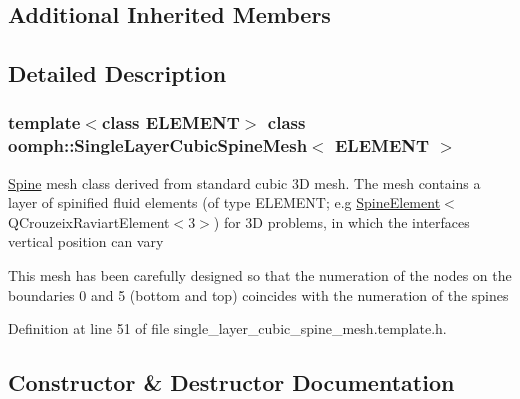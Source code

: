 \subsection*{Additional Inherited Members}


\subsection{Detailed Description}
\subsubsection*{template$<$class E\+L\+E\+M\+E\+NT$>$\newline
class oomph\+::\+Single\+Layer\+Cubic\+Spine\+Mesh$<$ E\+L\+E\+M\+E\+N\+T $>$}

\hyperlink{classoomph_1_1Spine}{Spine} mesh class derived from standard cubic 3D mesh. The mesh contains a layer of spinified fluid elements (of type E\+L\+E\+M\+E\+NT; e.\+g \hyperlink{classoomph_1_1SpineElement}{Spine\+Element}$<$Q\+Crouzeix\+Raviart\+Element$<$3$>$) for 3D problems, in which the interface\textquotesingle{}s vertical position can vary

This mesh has been carefully designed so that the numeration of the nodes on the boundaries 0 and 5 (bottom and top) coincides with the numeration of the spines 

Definition at line 51 of file single\+\_\+layer\+\_\+cubic\+\_\+spine\+\_\+mesh.\+template.\+h.



\subsection{Constructor \& Destructor Documentation}
\mbox{\label{classoomph_1_1SingleLayerCubicSpineMesh_a99a1c68b949c75b5afc9bb0eb93fec3e}} 
